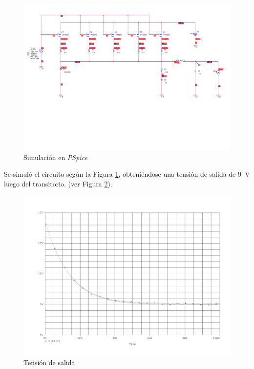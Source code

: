 \begin{figure}[H]
	\centering
	\includegraphics[scale=0.4]{Figuras/ej1_esq_sim.pdf}
	\caption{Simulación en \textit{PSpice}}
	\label{fig:ej1_esq_sim}
\end{figure}

Se simuló el circuito según la Figura \ref{fig:ej1_esq_sim}, obteniéndose una tensión de salida de \SI{9}{\volt} luego del transitorio. (ver Figura \ref{fig:sim_ej1_vo}).

\begin{figure}[H]
	\centering
	\includegraphics[scale=0.4]{Figuras/ej1_vo.pdf}
	\caption{Tensión de salida.}
	\label{fig:sim_ej1_vo}
\end{figure}

